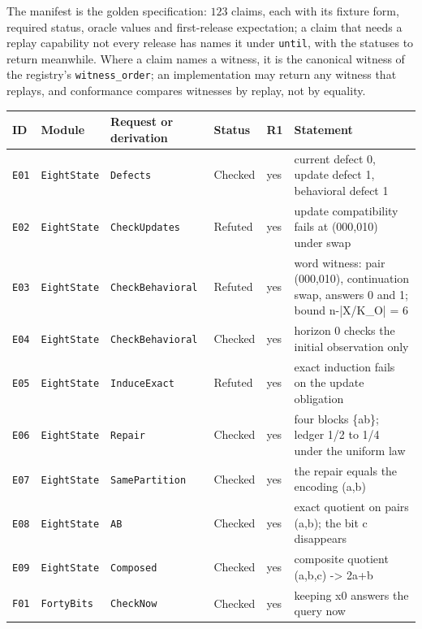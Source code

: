 \documentclass[11pt]{article}
\newcommand{\code}[1]{\texttt{#1}}
\begin{document}
The manifest is the golden specification: $123$ claims, each with its fixture form, required status,
oracle values and first-release expectation; a claim that needs a replay capability not every
release has names it under \code{until}, with the statuses to return meanwhile. Where a claim names a witness, it is the canonical
witness of the registry's \code{witness\_order}; an implementation may return any witness that
replays, and conformance compares witnesses by replay, not by equality.
{\scriptsize\begin{longtable}{>{\raggedright\arraybackslash}p{0.6cm}>{\raggedright\arraybackslash}p{2.7cm}>{\raggedright\arraybackslash}p{3.45cm}>{\raggedright\arraybackslash}p{1.65cm}>{\raggedright\arraybackslash}p{0.5cm}>{\raggedright\arraybackslash}p{4.35cm}}
\toprule ID & Module & Request or derivation & Status & R1 & Statement\\ \midrule \endhead
\code{E01} & \code{EightState} & \code{Defects} & Checked & yes & current defect 0,\allowbreak{} update defect 1,\allowbreak{} behavioral defect 1\\
\code{E02} & \code{EightState} & \code{CheckUpdates} & Refuted & yes & update compatibility fails at (000,\allowbreak{}010) under swap\\
\code{E03} & \code{EightState} & \code{CheckBehavioral} & Refuted & yes & word witness: pair (000,\allowbreak{}010),\allowbreak{} continuation swap,\allowbreak{} answers 0 and 1; bound n-|\allowbreak{}X/K\_O|\allowbreak{} = 6\\
\code{E04} & \code{EightState} & \code{CheckBehavioral} & Checked & yes & horizon 0 checks the initial observation only\\
\code{E05} & \code{EightState} & \code{InduceExact} & Refuted & yes & exact induction fails on the update obligation\\
\code{E06} & \code{EightState} & \code{Repair} & Checked & yes & four blocks \{ab\}; ledger 1/2 to 1/4 under the uniform law\\
\code{E07} & \code{EightState} & \code{SamePartition} & Checked & yes & the repair equals the encoding (a,\allowbreak{}b)\\
\code{E08} & \code{EightState} & \code{AB} & Checked & yes & exact quotient on pairs (a,\allowbreak{}b); the bit c disappears\\
\code{E09} & \code{EightState} & \code{Composed} & Checked & yes & composite quotient (a,\allowbreak{}b,\allowbreak{}c) -> 2a+b\\
\code{F01} & \code{FortyBits} & \code{CheckNow} & Checked & yes & keeping x0 answers the query now\\

\end{longtable}}
\end{document}
